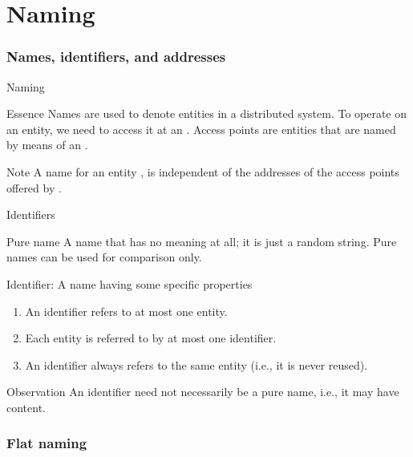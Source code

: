 \part{Naming}
\section{Names, identifiers, and addresses}
\begin{slide}{Naming}
  \begin{block}{Essence} 
    Names are used to denote entities in a distributed system. To operate on an entity, we need to access it
    at an . Access points are entities that are named by means of an .
  \end{block}
  \begin{alertblock}{Note}
    A  name for an entity , is independent of the addresses of the access
    points offered by .
  \end{alertblock}
\end{slide}
\begin{slide}{Identifiers}
  \begin{block}{Pure name}
    A name that has no meaning at all; it is just a random string. Pure names can be used for comparison only.
  \end{block}
  \begin{block}{Identifier: A name having some specific properties}
    \begin{enumerate}\tightlist
    \item An identifier refers to at most one entity.
    \item Each entity is referred to by at most one identifier.
    \item An identifier always refers to the same entity (i.e., it is never reused).
    \end{enumerate}
  \end{block}
  \begin{block}{Observation} 
    An identifier need not necessarily be a pure name, i.e., it may have content.
  \end{block}
\end{slide}
\section{Flat naming}
